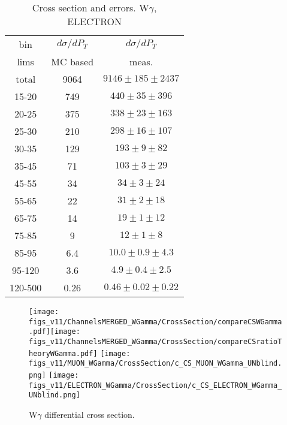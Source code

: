 \begin{table}[h]
  \scriptsize
  \begin{center}
  \caption{Cross section and errors. W$\gamma$, ELECTRON}
  \begin{tabular}{|c|c|c|}
    bin & $d\sigma/dP_{T}$ &$d\sigma/dP_{T}$ \\ 
    lims & MC based &    meas.       \\ \hline
    total & 9064 & $9146 \pm 185 \pm 2437$ \\ \hline
    15-20 & 749 & $440 \pm 35 \pm 396$ \\ \hline
    20-25 & 375 & $338 \pm 23 \pm 163$ \\ \hline
    25-30 & 210 & $298 \pm 16 \pm 107$ \\ \hline
    30-35 & 129 & $193 \pm 9 \pm 82$ \\ \hline
    35-45 & 71 & $103 \pm 3 \pm 29$ \\ \hline
    45-55 & 34 & $34 \pm 3 \pm 24$ \\ \hline
    55-65 & 22 & $31 \pm 2 \pm 18$ \\ \hline
    65-75 & 14 & $19 \pm 1 \pm 12$ \\ \hline
    75-85 & 9 & $12 \pm 1 \pm 8$ \\ \hline
    85-95 & 6.4 & $10.0 \pm 0.9 \pm 4.3$ \\ \hline
    95-120 & 3.6 & $4.9 \pm 0.4 \pm 2.5$ \\ \hline
    120-500 & 0.26 & $0.46 \pm 0.02 \pm 0.22$ \\ \hline
  \end{tabular}
  \label{tab:sc_mc_vs_meas_ELECTRON_WGamma}
  \end{center}
\end{table}

 
\begin{figure}[htb]
  \begin{center}
   \texttt{[image: figs\_v11/ChannelsMERGED\_WGamma/CrossSection/compareCSWGamma.pdf]}\texttt{[image: figs\_v11/ChannelsMERGED\_WGamma/CrossSection/compareCSratioTheoryWGamma.pdf]}
      \texttt{[image: figs\_v11/MUON\_WGamma/CrossSection/c\_CS\_MUON\_WGamma\_UNblind.png]} \texttt{[image: figs\_v11/ELECTRON\_WGamma/CrossSection/c\_CS\_ELECTRON\_WGamma\_UNblind.png]}
  \caption{W$\gamma$ differential cross section. }
  \label{fig:CS_Wg}
 \end{center}
\end{figure}




